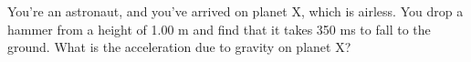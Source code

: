 %
You're an astronaut, and you've arrived on planet X, which is airless. You drop a
hammer from a height of 1.00 m and find that it takes 350
ms to fall to the ground. What is the acceleration due to
gravity on planet X?
